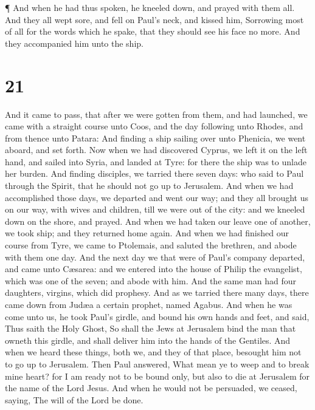  ¶ And when he had thus spoken, he kneeled down, and prayed
with them all.  And they all wept sore, and fell on Paul's
neck, and kissed him,  Sorrowing most of all for the words
which he spake, that they should see his face no more. And they
accompanied him unto the ship.

\hypertarget{section-20}{%
\section{21}\label{section-20}}

 And it came to pass, that after we were gotten from them,
and had launched, we came with a straight course unto Coos, and the day
following unto Rhodes, and from thence unto Patara:  And
finding a ship sailing over unto Phenicia, we went aboard, and set
forth.  Now when we had discovered Cyprus, we left it on the
left hand, and sailed into Syria, and landed at Tyre: for there the ship
was to unlade her burden.  And finding disciples, we tarried
there seven days: who said to Paul through the Spirit, that he should
not go up to Jerusalem.  And when we had accomplished those
days, we departed and went our way; and they all brought us on our way,
with wives and children, till we were out of the city: and we kneeled
down on the shore, and prayed.  And when we had taken our
leave one of another, we took ship; and they returned home again.
 And when we had finished our course from Tyre, we came to
Ptolemais, and saluted the brethren, and abode with them one day.
 And the next day we that were of Paul's company departed,
and came unto Cæsarea: and we entered into the house of Philip the
evangelist, which was one of the seven; and abode with him. 
And the same man had four daughters, virgins, which did prophesy.
 And as we tarried there many days, there came down from
Judæa a certain prophet, named Agabus.  And when he was
come unto us, he took Paul's girdle, and bound his own hands and feet,
and said, Thus saith the Holy Ghost, So shall the Jews at Jerusalem bind
the man that owneth this girdle, and shall deliver him into the hands of
the Gentiles.  And when we heard these things, both we, and
they of that place, besought him not to go up to Jerusalem.
 Then Paul answered, What mean ye to weep and to break mine
heart? for I am ready not to be bound only, but also to die at Jerusalem
for the name of the Lord Jesus.  And when he would not be
persuaded, we ceased, saying, The will of the Lord be done.

